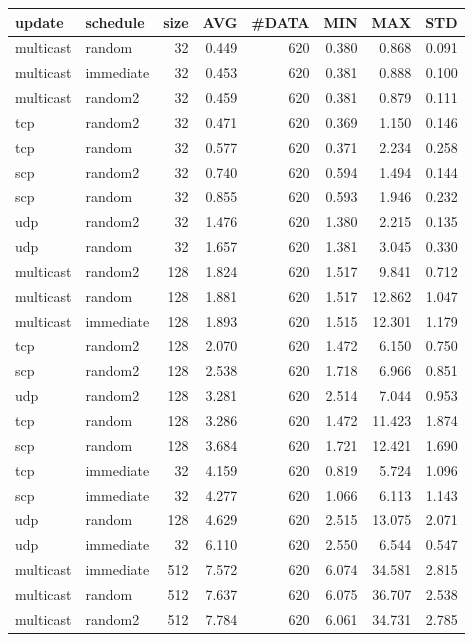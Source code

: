 \begin{tabular}{|llrrrrrr|}
\hline
{\sc update}&{\sc schedule}&{\sc size}&{\sc AVG}&{\sc\#DATA}&{\sc MIN}&{\sc MAX}&{\sc STD}\\
\hline
multicast & random & 32 &  0.449 & 620 & 0.380 & 0.868 & 0.091\\
multicast & immediate & 32 &  0.453 & 620 & 0.381 & 0.888 & 0.100\\
multicast & random2 & 32 &  0.459 & 620 & 0.381 & 0.879 & 0.111\\
tcp & random2 & 32 &  0.471 & 620 & 0.369 & 1.150 & 0.146\\
tcp & random & 32 &  0.577 & 620 & 0.371 & 2.234 & 0.258\\
scp & random2 & 32 &  0.740 & 620 & 0.594 & 1.494 & 0.144\\
scp & random & 32 &  0.855 & 620 & 0.593 & 1.946 & 0.232\\
udp & random2 & 32 &  1.476 & 620 & 1.380 & 2.215 & 0.135\\
udp & random & 32 &  1.657 & 620 & 1.381 & 3.045 & 0.330\\
multicast & random2 & 128 &  1.824 & 620 & 1.517 & 9.841 & 0.712\\
multicast & random & 128 &  1.881 & 620 & 1.517 & 12.862 & 1.047\\
multicast & immediate & 128 &  1.893 & 620 & 1.515 & 12.301 & 1.179\\
tcp & random2 & 128 &  2.070 & 620 & 1.472 & 6.150 & 0.750\\
scp & random2 & 128 &  2.538 & 620 & 1.718 & 6.966 & 0.851\\
udp & random2 & 128 &  3.281 & 620 & 2.514 & 7.044 & 0.953\\
tcp & random & 128 &  3.286 & 620 & 1.472 & 11.423 & 1.874\\
scp & random & 128 &  3.684 & 620 & 1.721 & 12.421 & 1.690\\
tcp & immediate & 32 &  4.159 & 620 & 0.819 & 5.724 & 1.096\\
scp & immediate & 32 &  4.277 & 620 & 1.066 & 6.113 & 1.143\\
udp & random & 128 &  4.629 & 620 & 2.515 & 13.075 & 2.071\\
udp & immediate & 32 &  6.110 & 620 & 2.550 & 6.544 & 0.547\\
multicast & immediate & 512 &  7.572 & 620 & 6.074 & 34.581 & 2.815\\
multicast & random & 512 &  7.637 & 620 & 6.075 & 36.707 & 2.538\\
multicast & random2 & 512 &  7.784 & 620 & 6.061 & 34.731 & 2.785\\

\end{tabular}
